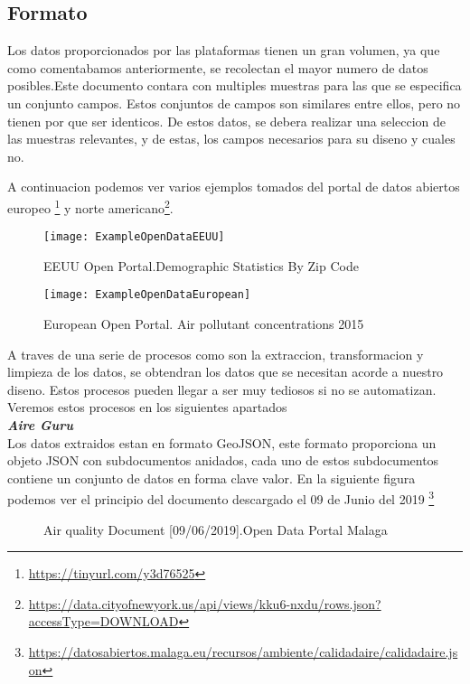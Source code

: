 \subsection{Formato}

Los datos proporcionados por las plataformas tienen un gran volumen, ya que como comentabamos anteriormente, se recolectan
el mayor numero de datos posibles.Este documento contara con multiples muestras para las que
se especifica un conjunto campos. Estos conjuntos de campos son similares entre ellos, pero no tienen por que ser identicos. 
De estos datos, se debera realizar una seleccion de las muestras relevantes, y de estas, los campos necesarios
para su diseno y cuales no.
\newpage

A continuacion podemos ver varios ejemplos tomados del portal de datos abiertos europeo
\footnote{\url{https://tinyurl.com/y3d76525}} 
y norte americano\footnote{\url{https://data.cityofnewyork.us/api/views/kku6-nxdu/rows.json?accessType=DOWNLOAD}}.

\begin{figure}[h]
    \centering
    \texttt{[image: ExampleOpenDataEEUU]}
    \caption{EEUU Open Portal.Demographic Statistics By Zip Code}
    \end{figure}

    \begin{figure}[h]
    \centering
    \texttt{[image: ExampleOpenDataEuropean]}
    \caption{European Open Portal. Air pollutant concentrations 2015} 
   
 
\end{figure}

\newpage
    
A traves de una serie de procesos como son  la extraccion, transformacion y 
limpieza de los datos, se obtendran los datos que se necesitan acorde a nuestro diseno. Estos procesos pueden llegar
a ser muy tediosos si no se automatizan.
Veremos estos procesos en los siguientes apartados\\
    
\noindent\textbf{\textit{Aire Guru} }\\

Los datos extraidos estan en formato GeoJSON, este formato proporciona un objeto JSON con subdocumentos anidados, cada uno de estos
subdocumentos contiene un conjunto de datos en forma clave valor. 
En la siguiente figura podemos ver el principio del documento descargado el 09 de Junio del 2019 
\footnote{\url{https://datosabiertos.malaga.eu/recursos/ambiente/calidadaire/calidadaire.json}}\\
\newpage
\begin{figure}[h]
    \centering
   \hfill
    \caption{Air quality Document [09/06/2019].Open Data Portal Malaga}
    \end{figure}
    
